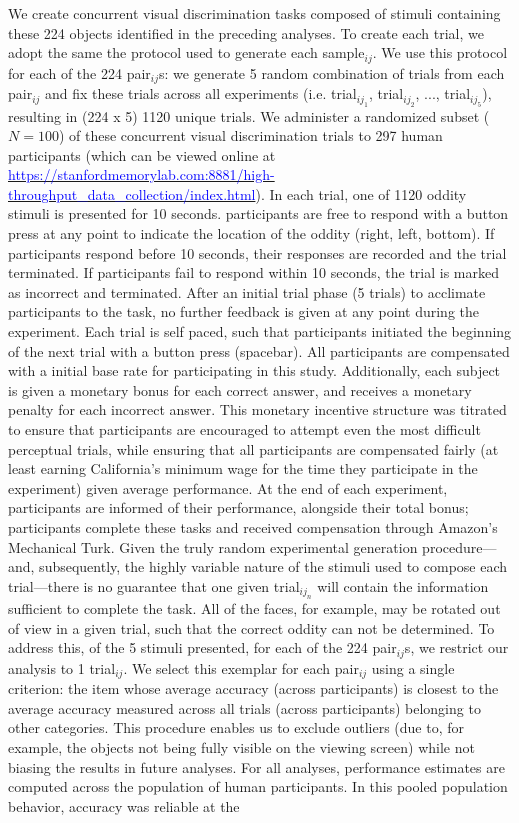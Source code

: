 \documentclass[11pt]{article}
\begin{document}
We create concurrent visual discrimination tasks composed of stimuli containing these 224 objects identified in the preceding analyses. To create each trial, we adopt the same the protocol used to generate each sample$_{ij}$. We use this protocol for each of the 224 pair$_{ij}$s: we generate 5 random combination of trials from each pair$_{ij}$ and fix these trials across all experiments (i.e. trial$_{ij_1}$, trial$_{ij_2}$, $...$, trial$_{ij_5}$), resulting in (224 x 5) 1120 unique trials. We administer a randomized subset ($N=100$) of these concurrent visual discrimination trials to 297 human participants (which can be viewed online at \href{https://stanfordmemorylab.com:8881/high-throughput_data_collection/}{\textcolor{blue}{https://stanfordmemorylab.com:8881/high-throughput\_data\_collection/index.html}}). In each trial, one of 1120 oddity stimuli is presented for 10 seconds. participants are free to respond with a button press at any point to indicate the location of the oddity (right, left, bottom). If participants respond before 10 seconds, their responses are recorded and the trial terminated. If participants fail to respond within 10 seconds, the trial is marked as incorrect and terminated. After an initial trial phase (5 trials) to acclimate participants to the task, no further feedback is given at any point during the experiment. Each trial is self paced, such that participants initiated the beginning of the next trial with a button press (spacebar). All participants are compensated with a initial base rate for participating in this study. Additionally, each subject is given a monetary bonus for each correct answer, and receives a monetary penalty for each incorrect answer. This monetary incentive structure was titrated to ensure that participants are encouraged to attempt even the most difficult perceptual trials, while ensuring that all participants are compensated fairly (at least earning California’s minimum wage for the time they participate in the experiment) given average performance. At the end of each experiment, participants are informed of their performance, alongside their total bonus; participants complete these tasks and received compensation through Amazon’s Mechanical Turk. Given the truly random experimental generation procedure---and, subsequently, the highly variable nature of the stimuli used to compose each trial---there is no guarantee that one given trial$_{ij_n}$ will contain the information sufficient to complete the task. All of the faces, for example, may be rotated out of view in a given trial, such that the correct oddity can not be determined. To address this, of the 5 stimuli presented, for each of the 224 pair$_{ij}$s, we restrict our analysis to 1 trial$_{ij}$. We select this exemplar for each  pair$_{ij}$ using a single criterion: the item whose average accuracy (across participants) is closest to the average accuracy measured across all trials (across participants) belonging to other categories. This procedure enables us to exclude outliers (due to, for example, the objects not being fully visible on the viewing screen) while not biasing the results in future analyses. For all analyses, performance estimates are computed across the population of human participants. In this pooled population behavior, accuracy was reliable at the 
\end{document}
